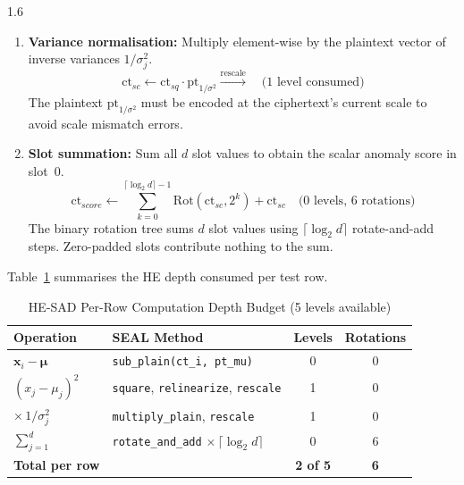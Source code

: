 \begin{spacing}{1.6}
\begin{enumerate}
  \item \textbf{Variance normalisation:} Multiply element-wise by the
  plaintext vector of inverse variances $1/\sigma_j^2$.
  \begin{equation}
    \mathrm{ct}_{sc} \leftarrow \mathrm{ct}_{sq} \cdot
    \mathrm{pt}_{1/\sigma^2}
    \xrightarrow{\text{rescale}}
    \quad \text{(1 level consumed)}
  \end{equation}
  The plaintext $\mathrm{pt}_{1/\sigma^2}$ must be encoded at the
  ciphertext's current scale to avoid scale mismatch errors.

  \item \textbf{Slot summation:} Sum all $d$ slot values to obtain the
  scalar anomaly score in slot~0.
  \begin{equation}
    \mathrm{ct}_{score} \leftarrow
    \sum_{k=0}^{\lceil\log_2 d\rceil - 1}
    \mathrm{Rot}(\mathrm{ct}_{sc}, 2^k) + \mathrm{ct}_{sc}
    \quad \text{(0 levels, 6 rotations)}
  \end{equation}
  The binary rotation tree sums $d$ slot values using
  $\lceil\log_2 d\rceil$ rotate-and-add steps.
  Zero-padded slots contribute nothing to the sum.
\end{enumerate}

Table~\ref{tab:sad_depth} summarises the HE depth consumed per test row.

\end{spacing}

\begin{table}[!ht]
\centering
\caption{HE-SAD Per-Row Computation Depth Budget (5 levels available)}
\label{tab:sad_depth}
\begin{tabular}{p{4cm}p{5cm}cc}
\toprule
\textbf{Operation} & \textbf{SEAL Method} & \textbf{Levels} & \textbf{Rotations} \\
\midrule
$\mathbf{x}_i - \boldsymbol{\mu}$ &
  \texttt{sub\_plain(ct\_i, pt\_mu)} & 0 & 0 \\
$(x_j - \mu_j)^2$ &
  \texttt{square}, \texttt{relinearize}, \texttt{rescale} & 1 & 0 \\
$\times\,1/\sigma_j^2$ &
  \texttt{multiply\_plain}, \texttt{rescale} & 1 & 0 \\
$\sum_{j=1}^{d}$ &
  \texttt{rotate\_and\_add} $\times\,\lceil\log_2 d\rceil$ & 0 & 6 \\
\midrule
\textbf{Total per row} & & \textbf{2 of 5} & \textbf{6} \\
\bottomrule
\end{tabular}
\end{table}

